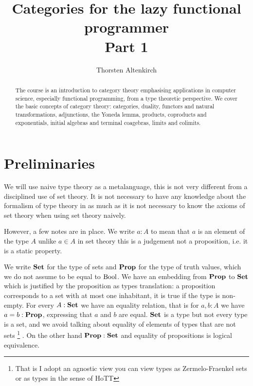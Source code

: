 

\renewcommand{\ExerciseHeader}{{\noindent\textbf{
\ExerciseName\ \ExerciseHeaderNB\ExerciseHeaderTitle
\ExerciseHeaderOrigin\;}}}
\renewcommand{\AnswerHeader}{\noindent{\textit{\textbf{Solution\ \ExerciseHeaderNB:}}\;}}
\renewcommand{\ExerciseSkipAfter}{8pt}
\renewcommand{\AnswerSkipAfter}{8pt}

\newtheorem{question}[Exercise]{Question}

\title{Categories for the lazy functional programmer\\
Part 1}
\author{Thorsten Altenkirch}



\maketitle

\begin{abstract}
  The course is an introduction to category theory emphasising applications in computer science, especially functional programming, from a type theoretic perspective. We cover the basic concepts of category theory: categories, duality, functors and natural transformations, adjunctions, the Yoneda lemma, products, coproducts and exponentials, initial algebras and terminal coagebras,  limits and colimits. %
\end{abstract}

\tableofcontents

\section{Preliminaries}
\label{sec:prelim}

We will use naive type theory as a metalanguage, this is not very different from a disciplined use of set theory. It is not necessary to have any knowledge about the formalism of type theory in as much as it is not necessary to know the axioms of set theory when using set theory naively.

However, a few notes are in place. We write $a : A$ to mean that $a$ is an element of the type $A$ unlike $a \in A$ in set theory this is a judgement not a proposition, i.e. it is a static property.

We write $\mathbf{Set}$ for the type of sets and $\mathbf{Prop}$ for the type of truth values, which we do not assume to be equal to  $\mathrm{Bool}$. We have an embedding from $\mathbf{Prop}$ to $\mathbf{Set}$ which is justified by the proposition as types translation: a proposition corresponds to a set with at most one inhabitant, it  is true if the type is non-empty. For every $A:\mathbf{Set}$ we have an equality relation, that is for $a,b : A$ we have $a = b : \mathbf{Prop}$, expressing that $a$ and $b$ are equal. $\mathbf{Set}$ is a type but not every type is a set, and we avoid talking about equality of elements of types that are not sets%
\footnote{That is I adopt an agnostic view you can view types as Zermelo-Fraenkel sets or as types in the sense of HoTT}%
. On the other hand $\mathbf{Prop} : \mathbf{Set}$ and equality of propositions is logical equivalence. 

